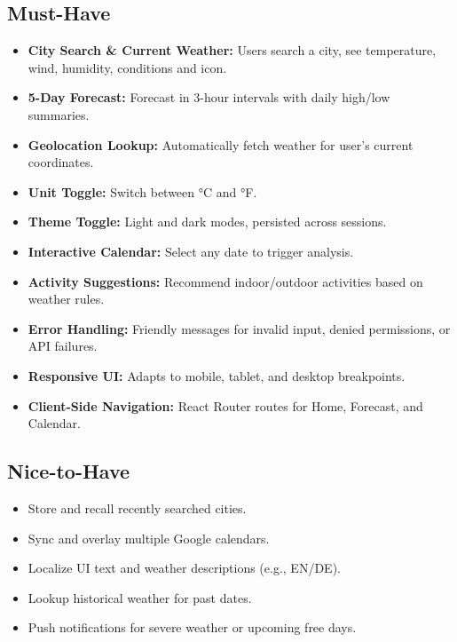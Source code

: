 \documentclass[12pt,a4paper]{article}
\begin{document}
\subsection*{Must-Have}
\begin{itemize}[nosep]
  \item \textbf{City Search \& Current Weather:} Users search a city, see temperature, wind, humidity, conditions and icon.
  \item \textbf{5-Day Forecast:} Forecast in 3-hour intervals with daily high/low summaries.
  \item \textbf{Geolocation Lookup:} Automatically fetch weather for user’s current coordinates.
  \item \textbf{Unit Toggle:} Switch between °C and °F.
  \item \textbf{Theme Toggle:} Light and dark modes, persisted across sessions.
  \item \textbf{Interactive Calendar:} Select any date to trigger analysis.
  \item \textbf{Activity Suggestions:} Recommend indoor/outdoor activities based on weather rules.
  \item \textbf{Error Handling:} Friendly messages for invalid input, denied permissions, or API failures.
  \item \textbf{Responsive UI:} Adapts to mobile, tablet, and desktop breakpoints.
  \item \textbf{Client-Side Navigation:} React Router routes for Home, Forecast, and Calendar.
\end{itemize}

\subsection*{Nice-to-Have}
\begin{itemize}[nosep]
  \item Store and recall recently searched cities.
  \item Sync and overlay multiple Google calendars.
  \item Localize UI text and weather descriptions (e.g., EN/DE).
  \item Lookup historical weather for past dates.
  \item Push notifications for severe weather or upcoming free days.
\end{itemize}

\newpage
\end{document}
